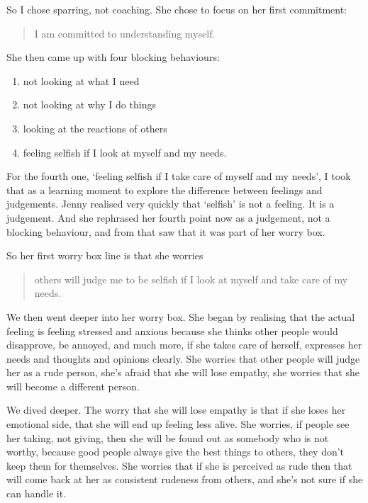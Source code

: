 \begin{longstoryblock}
So I chose sparring, not coaching. She chose to focus on her first commitment:
\begin{quote} I am committed to understanding myself. \end{quote}


She then came up with four blocking behaviours: 


\begin{enumerate} 
\item not looking at what I need
\item not looking at why I do things
\item looking at the reactions of others
\item feeling selfish if I look at myself and my needs.
\end{enumerate}


For the fourth one, ‘feeling selfish if I take care of myself and my needs’, I took that as a learning moment to explore the difference between feelings and judgements. Jenny realised very quickly that ‘selfish’ is not a feeling. It is a judgement. And she rephrased her fourth point now as a judgement, not a blocking behaviour, and from that saw that it was part of her worry box. 


So her first worry box line is that she worries 
\begin{quote} 
others will judge me to be selfish if I look at myself and take care of my needs.
\end{quote}


We then went deeper into her worry box. She began by realising that the actual feeling is feeling stressed and anxious because she thinks other people would disapprove, be annoyed, and much more, if she takes care of herself, expresses her needs and thoughts and opinions clearly. She worries that other people will judge her as a rude person, she's afraid that she will lose empathy, she worries that she will become a different person. 


We dived deeper. The worry that she will lose empathy is that if she loses her emotional side, that she will end up feeling less alive. She worries, if people see her taking, not giving, then she will be found out as somebody who is not worthy, because good people always give the best things to others, they don't keep them for themselves. She worries that if she is perceived as rude then that will come back at her as consistent rudeness from others, and she's not sure if she can handle it.



\end{longstoryblock}
